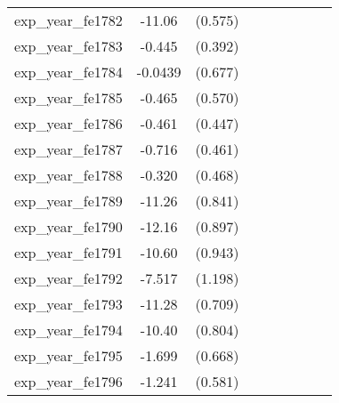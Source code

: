 {\begin{tabular}{l*{4}{cc}}
exp\_year\_fe1782&   -11.06\sym{***}&  (0.575)&                  &         &                  &         &                  &         \\
exp\_year\_fe1783&   -0.445         &  (0.392)&                  &         &                  &         &                  &         \\
exp\_year\_fe1784&  -0.0439         &  (0.677)&                  &         &                  &         &                  &         \\
exp\_year\_fe1785&   -0.465         &  (0.570)&                  &         &                  &         &                  &         \\
exp\_year\_fe1786&   -0.461         &  (0.447)&                  &         &                  &         &                  &         \\
exp\_year\_fe1787&   -0.716         &  (0.461)&                  &         &                  &         &                  &         \\
exp\_year\_fe1788&   -0.320         &  (0.468)&                  &         &                  &         &                  &         \\
exp\_year\_fe1789&   -11.26\sym{***}&  (0.841)&                  &         &                  &         &                  &         \\
exp\_year\_fe1790&   -12.16\sym{***}&  (0.897)&                  &         &                  &         &                  &         \\
exp\_year\_fe1791&   -10.60\sym{***}&  (0.943)&                  &         &                  &         &                  &         \\
exp\_year\_fe1792&   -7.517\sym{***}&  (1.198)&                  &         &                  &         &                  &         \\
exp\_year\_fe1793&   -11.28\sym{***}&  (0.709)&                  &         &                  &         &                  &         \\
exp\_year\_fe1794&   -10.40\sym{***}&  (0.804)&                  &         &                  &         &                  &         \\
exp\_year\_fe1795&   -1.699\sym{*}  &  (0.668)&                  &         &                  &         &                  &         \\
exp\_year\_fe1796&   -1.241\sym{*}  &  (0.581)&                  &         &                  &         &                  &         \\

\end{tabular}}
